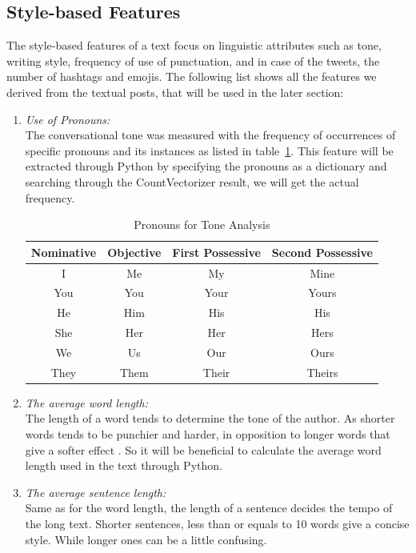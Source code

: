 \subsection{Style-based Features}
The style-based features of a text focus on linguistic attributes such as tone, writing style, frequency of use of punctuation, and in case of the tweets, the number of hashtags and emojis. The following list shows all the features we derived from the textual posts, that will be used in the later section:
\begin{enumerate}
\item \textit{Use of Pronouns:} \\
The conversational tone was measured with the frequency of occurrences of specific pronouns and its instances as listed in table~\ref{tab:pronouns}. This feature will be extracted through Python by specifying the pronouns as a dictionary and searching through the CountVectorizer result, we will get the actual frequency.

\begin{table}[H]
\centering
\caption{Pronouns for Tone Analysis}
\label{tab:pronouns}
\begin{tabular}{cccc}
\hline
\textbf{Nominative} &
  \textbf{Objective} &
  \textbf{First Possessive} &
  \textbf{Second Possessive} \\ \hline
I & Me & My & Mine \\ \hline
You & You & Your & Yours \\ \hline
He & Him & His & His \\ \hline
She & Her & Her & Hers \\ \hline
We & Us & Our & Ours \\ \hline
They & Them & Their & Theirs \\ \hline
\end{tabular}
\end{table}

\item \textit{The average word length:}\\
The length of a word tends to determine the tone of the author. As shorter words tends to be punchier and harder, in opposition to longer words that give a softer effect \cite{Baxter-Read_Baxter-Read_2023}. So it will be beneficial to calculate the average word length used in the text through Python.

\item \textit{The average sentence length:}\\
Same as for the word length, the length of a sentence decides the tempo of the long text. Shorter sentences, less than or equals to 10 words give a concise style. While longer ones can be a little confusing.


\end{enumerate}
